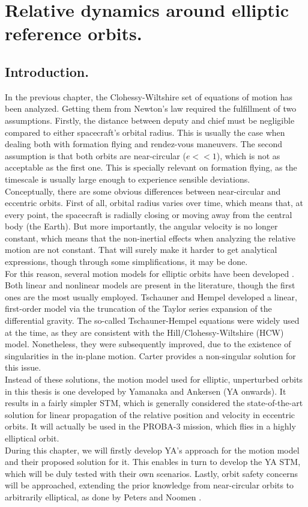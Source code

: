 \chapter{Relative dynamics around elliptic reference orbits.}
%
\label{chap:Eccentric}
%
\section{Introduction.}
%
\indent In the previous chapter, the Clohessy-Wiltshire set of equations of motion has been analyzed. Getting them from Newton's law required the fulfillment of two assumptions. Firstly, the distance between deputy and chief must be negligible compared to either spacecraft's orbital radius. This is usually the case when dealing both with formation flying and rendez-vous maneuvers. The second assumption is that both orbits are near-circular ($e<<1$), which is not as acceptable as the first one. This is specially relevant on formation flying, as the timescale is usually large enough to experience sensible deviations. \\
%
\indent Conceptually, there are some obvious differences between near-circular and eccentric orbits. First of all, orbital radius varies over time, which means that, at every point, the spacecraft is radially closing or moving away from the central body (\ie the Earth). But more importantly, the angular velocity is no longer constant, which means that the non-inertial effects when analyzing the relative motion are not constant. That will surely make it harder to get analytical expressions, though through some simplifications, it may be done.\\
%
\indent For this reason, several motion models for elliptic orbits have been developed \cite{Sullivan}. Both linear and nonlinear models are present in the literature, though the first ones are the most usually employed. Tschauner and Hempel \cite{Tschauner_Hempel} developed a linear, first-order model via the truncation of the Taylor series expansion of the differential gravity. The so-called Tschauner-Hempel equations were widely used at the time, as they are consistent with the Hill/Clohessy-Wiltshire (HCW) model. Nonetheless, they were subsequently improved, due to the existence of singularities in the in-plane motion. Carter \cite{Carter} provides a non-singular solution for this issue. \\
%
\indent Instead of these solutions, the motion model used for elliptic, unperturbed orbits in this thesis is one developed by Yamanaka and Ankersen \cite{Yamanaka_Ankersen} (YA onwards). It results in a fairly simpler STM, which is generally considered the state-of-the-art solution for linear propagation of the relative position and velocity in eccentric orbits. It will actually be used in the PROBA-3 mission, which flies in a highly elliptical orbit.\\
%
\indent During this chapter, we will firstly develop YA's approach for the motion model and their proposed solution for it. This enables in turn to develop the YA STM, which will be duly tested with their own scenarios. Lastly, orbit safety concerns will be approached, extending the prior knowledge from near-circular orbits to arbitrarily elliptical, as done by Peters and Noomen \cite{Peters_Noomen}.
%
